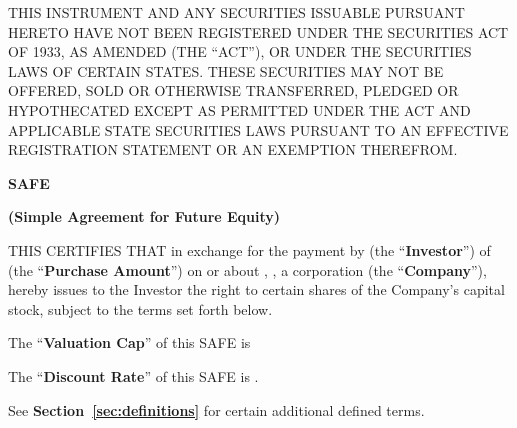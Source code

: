 \begin{sloppypar}
THIS INSTRUMENT AND ANY SECURITIES ISSUABLE PURSUANT HERETO HAVE NOT
BEEN REGISTERED UNDER THE SECURITIES ACT OF 1933, AS AMENDED (THE
“ACT”), OR UNDER THE SECURITIES LAWS OF CERTAIN STATES. THESE
SECURITIES MAY NOT BE OFFERED, SOLD OR OTHERWISE TRANSFERRED, PLEDGED
OR HYPOTHECATED EXCEPT AS PERMITTED UNDER THE ACT AND APPLICABLE STATE
SECURITIES LAWS PURSUANT TO AN EFFECTIVE REGISTRATION STATEMENT OR AN
EXEMPTION THEREFROM.
\end{sloppypar}

\begin{center}
\Company{}


\textbf{SAFE}

\textbf{(Simple Agreement for Future Equity)}

\end{center}

\begin{sloppypar}
THIS CERTIFIES THAT in exchange for the payment by \InvestorName{}
(the “\textbf{Investor}”) of \InvestmentAmount{} (the
“\textbf{Purchase Amount}”) on or about \InvestmentDate{}, \Company{},
a \IncorporationState{} corporation (the “\textbf{Company}”), hereby
issues to the Investor the right to certain shares of the Company’s
capital stock, subject to the terms set forth below.
\end{sloppypar}

\ifcap
The “\textbf{Valuation Cap}” of this SAFE is \ValuationCap{}
\fi

\ifdiscount
The “\textbf{Discount Rate}” of this SAFE is \DiscountRate{}.
\fi

See \textbf{Section~\ref{sec:definitions}} for certain additional defined terms.
